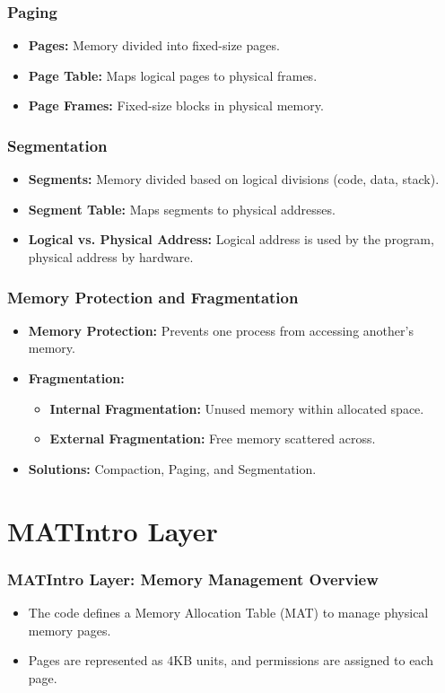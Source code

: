 \documentclass{beamer}
\begin{document}
	\begin{frame}
		\frametitle{Paging}
		\begin{itemize}
			\item \textbf{Pages:} Memory divided into fixed-size pages.
			\item \textbf{Page Table:} Maps logical pages to physical frames.
			\item \textbf{Page Frames:} Fixed-size blocks in physical memory.
		\end{itemize}
	\end{frame}
	
	\begin{frame}
		\frametitle{Segmentation}
		\begin{itemize}
			\item \textbf{Segments:} Memory divided based on logical divisions (code, data, stack).
			\item \textbf{Segment Table:} Maps segments to physical addresses.
			\item \textbf{Logical vs. Physical Address:} Logical address is used by the program, physical address by hardware.
		\end{itemize}
	\end{frame}
	
	\begin{frame}
		\frametitle{Memory Protection and Fragmentation}
		\begin{itemize}
			\item \textbf{Memory Protection:} Prevents one process from accessing another's memory.
			\item \textbf{Fragmentation:} 
			\begin{itemize}
				\item \textbf{Internal Fragmentation:} Unused memory within allocated space.
				\item \textbf{External Fragmentation:} Free memory scattered across.
			\end{itemize}
			\item \textbf{Solutions:} Compaction, Paging, and Segmentation.
		\end{itemize}
	\end{frame}
	
		
		
	\section{MATIntro Layer}
	\begin{frame}
		\frametitle{MATIntro Layer: Memory Management Overview}
		
		\begin{itemize}
			\item The code defines a Memory Allocation Table (MAT) to manage physical memory pages.
			\item Pages are represented as 4KB units, and permissions are assigned to each page.
		\end{itemize}
			
		
	\end{frame}
	
\end{document}
